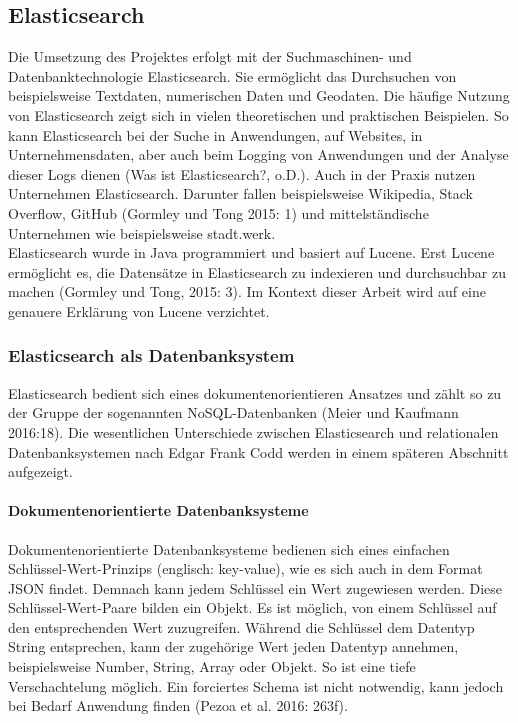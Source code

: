 \documentclass[a4paper]{scrartcl}
\begin{document}
\subsection{Elasticsearch}
Die Umsetzung des Projektes erfolgt mit der Suchmaschinen- und Datenbanktechnologie Elasticsearch. Sie ermöglicht das Durchsuchen von beispielsweise Textdaten, numerischen Daten und Geodaten. Die häufige Nutzung von Elasticsearch zeigt sich in vielen theoretischen und praktischen Beispielen. So kann Elasticsearch bei der Suche in Anwendungen, auf Websites, in Unternehmensdaten, aber auch beim Logging von Anwendungen und der Analyse dieser Logs dienen (Was ist Elasticsearch?, o.D.). Auch in der Praxis nutzen Unternehmen Elasticsearch. Darunter fallen beispielsweise Wikipedia, Stack Overflow, GitHub (Gormley und Tong 2015: 1) und mittelständische Unternehmen wie beispielsweise stadt.werk. \\
Elasticsearch wurde in Java programmiert und basiert auf Lucene. Erst Lucene ermöglicht es, die Datensätze in Elasticsearch zu indexieren und durchsuchbar zu machen (Gormley und Tong, 2015: 3). Im Kontext dieser Arbeit wird auf eine genauere Erklärung von Lucene verzichtet.


\subsubsection{Elasticsearch als Datenbanksystem}
Elasticsearch bedient sich eines dokumentenorientieren Ansatzes und zählt so zu der Gruppe der sogenannten NoSQL-Datenbanken (Meier und Kaufmann 2016:18). Die wesentlichen Unterschiede zwischen Elasticsearch und relationalen Datenbanksystemen nach Edgar Frank Codd werden in einem späteren Abschnitt aufgezeigt. 

\paragraph{Dokumentenorientierte Datenbanksysteme}
Dokumentenorientierte Datenbanksysteme bedienen sich eines einfachen Schlüssel-Wert-Prinzips (englisch: key-value), wie es sich auch in dem Format JSON findet. Demnach kann jedem Schlüssel ein Wert zugewiesen werden. Diese Schlüssel-Wert-Paare bilden ein Objekt. Es ist möglich, von einem Schlüssel auf den entsprechenden Wert zuzugreifen. Während die Schlüssel dem Datentyp String entsprechen, kann der zugehörige Wert jeden Datentyp annehmen, beispielsweise Number, String, Array oder Objekt. So ist eine tiefe Verschachtelung möglich. Ein forciertes Schema ist nicht notwendig, kann jedoch bei Bedarf Anwendung finden (Pezoa et al. 2016: 263f).
\end{document}
